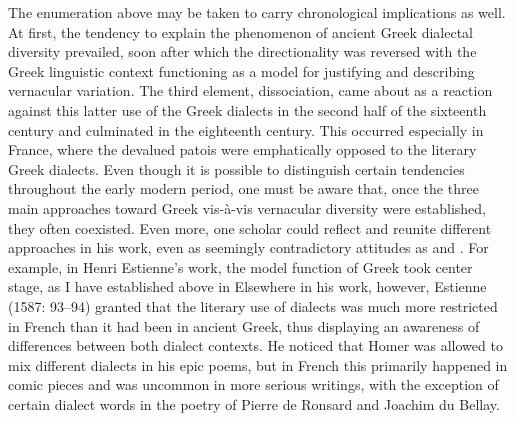 \documentclass[output=paper]{langsci/langscibook}
\begin{document}
The enumeration above may be taken to carry chronological implications as well. At first, the tendency to explain the phenomenon of ancient Greek dialectal diversity prevailed, soon after which the directionality was reversed with the Greek linguistic context functioning as a model for justifying and describing vernacular variation. The third element, dissociation, came about as a reaction against this latter use of the Greek dialects in the second half of the sixteenth century and culminated in the eighteenth century. This occurred especially in France, where the devalued patois were emphatically opposed to the literary Greek dialects. Even though it is possible to distinguish certain tendencies throughout the early modern period, one must be aware that, once the three main approaches toward Greek vis-à-vis vernacular diversity were established, they often coexisted. Even more, one scholar could reflect and reunite different approaches in his work, even as seemingly contradictory attitudes as  and . For example, in Henri Estienne’s work, the model function of Greek took center stage, as I have established above in  Elsewhere in his work, however, Estienne (1587: 93–94) granted that the literary use of dialects was much more restricted in French than it had been in ancient Greek, thus displaying an awareness of differences between both dialect contexts. He noticed that Homer was allowed to mix different dialects in his epic poems, but in French this primarily happened in comic pieces and was uncommon in more serious writings, with the exception of certain dialect words in the poetry of Pierre de Ronsard and Joachim du Bellay.
\end{document}
